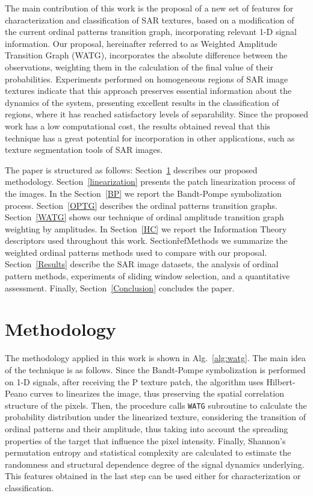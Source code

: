 \documentclass[journal]{IEEEtran}
\begin{document}
	The main contribution of this work is the proposal of a new set of features for characterization and classification of SAR textures, based on a modification of the current ordinal patterns transition graph, incorporating relevant 1-D signal information.
	Our proposal, hereinafter referred to as Weighted Amplitude Transition Graph (WATG), incorporates the absolute difference between the observations, weighting them in the calculation of the final value of their probabilities.
	Experiments performed on homogeneous regions of SAR image textures indicate that this approach preserves essential information about the dynamics of the system, presenting excellent results in the classification of regions, where it has reached satisfactory levels of separability.
	Since the proposed work has a low computational cost, the results obtained reveal that this technique has a great potential for incorporation in other applications, such as texture segmentation tools of SAR images.
	
	The paper is structured as follows:
	Section~\ref{methodology} describes our proposed methodology.
	Section~\ref{linearization} presents the patch linearization process of the images.
	In the Section~\ref{BP} we report the Bandt-Pompe symbolization process.
	Section~\ref{OPTG} describes the ordinal patterns transition graphs.
	Section~\ref{WATG} shows our technique of ordinal amplitude transition graph weighting by amplitudes.
	In Section~\ref{HC} we report the Information Theory descriptors used throughout this work.
	Section\~ref{Methods} we summarize the weighted ordinal patterns methods used to compare with our proposal.
	Section~\ref{Results} describe the SAR image datasets, 
	the analysis of ordinal pattern methods, 
	experiments of sliding window selection, 
	and a quantitative assessment.
	Finally, Section~\ref{Conclusion} concludes the paper.
	
	\section{Methodology}\label{methodology}
	
	The methodology applied in this work is shown in Alg.~\ref{alg:watg}.
	The main idea of the technique is as follows.
	Since the Bandt-Pompe symbolization is performed on 1-D signals, after receiving the P texture patch, the algorithm uses Hilbert-Peano curves to linearizes the image, thus preserving the spatial correlation structure of the pixels.
	Then, the procedure calls \texttt{WATG} subroutine to calculate the probability distribution under the linearized texture, considering the transition of ordinal patterns and their amplitude, thus taking into account the spreading properties of the target that influence the pixel intensity.
	Finally, Shannon's permutation entropy and statistical complexity are calculated to estimate the randomness and structural dependence degree of the signal dynamics underlying.
	This features obtained in the last step can be used either for characterization or classification.
	
\end{document}
